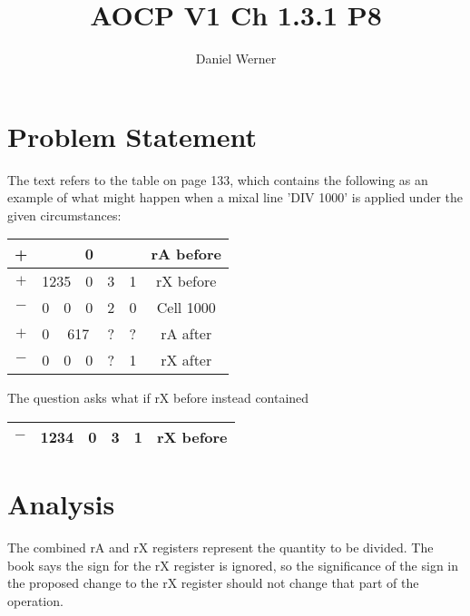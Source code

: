 \documentclass{article}
\title{AOCP V1 Ch 1.3.1 P8}
\author{Daniel Werner}
\begin{document}
\maketitle

\section*{Problem Statement}

The text refers to the table on page 133, which contains
the following as an example of what might happen when
a mixal line 'DIV 1000' is applied under the given
circumstances:

\vspace*{1em}

\begin{tabular}{|c|c|c|c|c|c|c|}
    \hline
    + & \multicolumn{5}{c|}{0} & rA before \\
    \hline
    $+$ & \multicolumn{2}{c|}{1235} & 0 & 3 & 1 & rX before \\
    \hline
    $-$ & 0 & 0 & 0 & 2 & 0 & Cell 1000 \\
    \hline
    $+$ & 0 & \multicolumn{2}{c|}{617} & ? & ? & rA after \\
    \hline
    $-$ & 0 & 0 & 0 & ? & 1 & rX after \\
    \hline
\end{tabular}

\vspace*{1em}

The question asks what if rX before instead contained

\vspace*{1em}

\begin{tabular}{|c|c|c|c|c|c|c|}
    \hline
    $-$ & \multicolumn{2}{c|}{1234} & 0 & 3 & 1 & rX before \\
    \hline
\end{tabular}

\section*{Analysis}

The combined rA and rX registers represent the quantity to
be divided.  The book says the sign for the rX register is
ignored, so the significance of the sign in the proposed
change to the rX register should not change that part of the
operation.

\par
\end{document}

